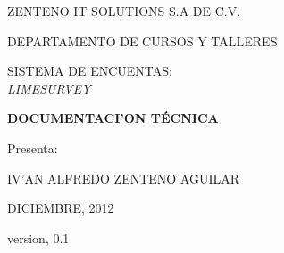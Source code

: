 \documentclass[12pt,spanish]{report}
\begin{document}
\begin{center}
\LARGE{ZENTENO IT SOLUTIONS S.A DE C.V.}\\
\end{center}

\vspace{0.05in}

\begin{center}
\large{DEPARTAMENTO DE CURSOS Y TALLERES}\\
\end{center}

\vspace{0.1in}

\par
\centerline{\hbox{}}
\par

\vspace{0.1in}

\begin{center}
\LARGE{SISTEMA DE ENCUENTAS:}\\
\emph{LIMESURVEY}\\
\end{center}

\vspace{0.1in}

\begin{center}
{\bfseries{DOCUMENTACI'ON  T\'ECNICA}}\\
\end{center}

\begin{center}
\large{Presenta:}\\
\end{center}

\vspace{0.1in}

\begin{center}
\Large{IV'AN ALFREDO ZENTENO AGUILAR}\\
\end{center}

\vspace{0.5in}

\begin{center}
{DICIEMBRE, 2012}
\end{center}
\begin{center}
{version, 0.1}
\end{center}

\end{document}
